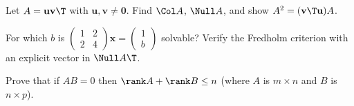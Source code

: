 \begin{exercise}
Let $A=\mathbf{u}\mathbf{v}\T$ with $\mathbf{u},\mathbf{v}\ne\mathbf{0}$. Find $\Col A$, $\Null A$, and show $A^2=(\mathbf{v}\T\mathbf{u})A$.
\end{exercise}

\begin{exercise}
For which $b$ is $\begin{pmatrix}1&2\\2&4\end{pmatrix}\mathbf{x}=\begin{pmatrix}1\\b\end{pmatrix}$ solvable? Verify the Fredholm criterion with an explicit vector in $\Null A\T$.
\end{exercise}

\begin{exercise}
Prove that if $AB=0$ then $\rank A+\rank B\le n$ (where $A$ is $m\times n$ and $B$ is $n\times p$).
\end{exercise}
